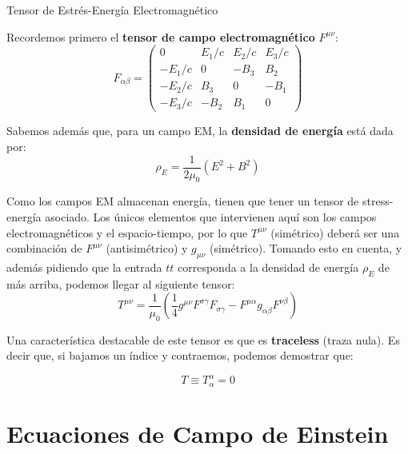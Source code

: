 \begin{remarkbox}{Tensor de Estrés-Energía Electromagnético}

    Recordemos primero el \textbf{tensor de campo electromagnético} $F^{\mu\nu}$:
    \begin{equation}
    F_{\alpha\beta}=
    \begin{pmatrix}
    0 & E_1/c & E_2/c & E_3/c\\
    -E_1/c & 0 & -B_3 & B_2\\
    -E_2/c & B_3 & 0 & -B_1\\
    -E_3/c & -B_2 & B_1 & 0
    \end{pmatrix}
    \label{tensorcampoelectromagnetico}
    \end{equation}

    Sabemos además que, para un campo EM, la \textbf{densidad de energía} está dada por:
    $$\rho_E=\frac{1}{2\mu_0}\left(E^2+B^2\right)$$
    
    Como los campos EM almacenan energía, tienen que tener un tensor de stress-energía asociado. Los únicos elementos que intervienen aquí son los campos electromagnéticos y el espacio-tiempo, por lo que $T^{\mu\nu}$ (simétrico) deberá ser una combinación de $F^{\mu\nu}$ (antisimétrico) y $g_{\mu\nu}$ (simétrico). Tomando esto en cuenta, y además pidiendo que la entrada $tt$ corresponda a la densidad de energía $\rho_E$ de más arriba, podemos llegar al siguiente tensor:
    \begin{equation}
    T^{\mu\nu}=\frac{1}{\mu_0}\left(\frac{1}{4}g^{\mu\nu}F^{\sigma\gamma}F_{\sigma\gamma}-F^{\mu\alpha}g_{\alpha\beta}F^{\nu\beta}\right)
    \label{tensorestresenergiafunciondeF}
    \end{equation}
    
    
    Una característica destacable de este tensor es que es \textbf{traceless} (traza nula). Es decir que, si bajamos un índice y contraemos, podemos demostrar que:
    
    \begin{equation}
        T\equiv T^{\alpha}_{\alpha}=0
        \label{traceless}
    \end{equation}
\end{remarkbox}

\newpage

\section{\huge{Ecuaciones de Campo de Einstein}}

